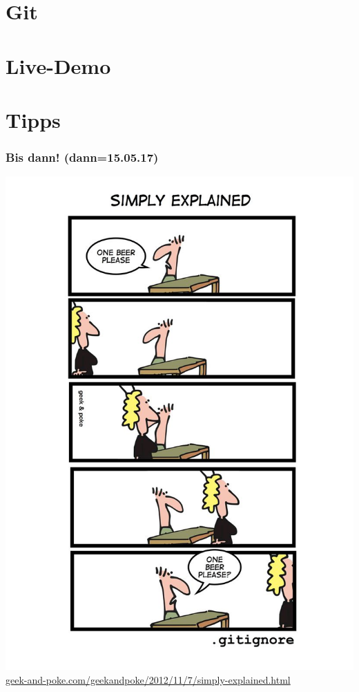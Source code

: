 \documentclass[18pt]{beamer}
\begin{document}
\section{Git}
		
\section{Live-Demo}		
		
\section{Tipps}
		

		\begin{frame}
			\frametitle{Bis dann! (dann=15.05.17)}
			\centering
			\includegraphics[height=0.85\textheight]{./comics/geek_and_poke_gitignore.jpg}
			\tiny\url{geek-and-poke.com/geekandpoke/2012/11/7/simply-explained.html}
		\end{frame}
\end{document}
